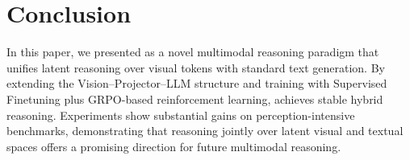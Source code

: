
\section{Conclusion}
In this paper, we presented \modelname as a novel multimodal reasoning paradigm that unifies latent reasoning over visual tokens with standard text generation. By extending the Vision–Projector–LLM structure and training with Supervised Finetuning plus GRPO-based reinforcement learning, \modelname achieves stable hybrid reasoning. Experiments show substantial gains on perception-intensive benchmarks, demonstrating that reasoning jointly over latent visual and textual spaces offers a promising direction for future multimodal reasoning.